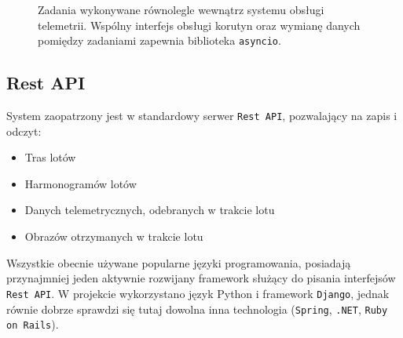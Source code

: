 \begin{figure}[H]
	\centering\small
\begin{center}
\end{center}
\caption{
		Zadania wykonywane równolegle wewnątrz systemu obsługi telemetrii.
		Wspólny interfejs obsługi korutyn oraz wymianę danych pomiędzy
		zadaniami zapewnia biblioteka \texttt{asyncio}.	
	}
	\label{telemetry_backend_asyncio}
\end{figure}


\subsection{Rest API}

System zaopatrzony jest w standardowy serwer
\texttt{Rest API}\cite{principled_design_of_modern_web_apps},
pozwalający na zapis i odczyt:

\begin{itemize}
	\item Tras lotów
	\item Harmonogramów lotów
	\item Danych telemetrycznych, odebranych w trakcie lotu
	\item Obrazów otrzymanych w trakcie lotu
\end{itemize}

Wszystkie obecnie używane popularne języki programowania,
posiadają przynajmniej jeden aktywnie rozwijany framework 
służący do pisania interfejsów \texttt{Rest API}. W projekcie
wykorzystano język Python i framework \texttt{Django},
jednak równie dobrze sprawdzi się tutaj dowolna inna technologia
(\texttt{Spring}, \texttt{.NET}, \texttt{Ruby on Rails}).

